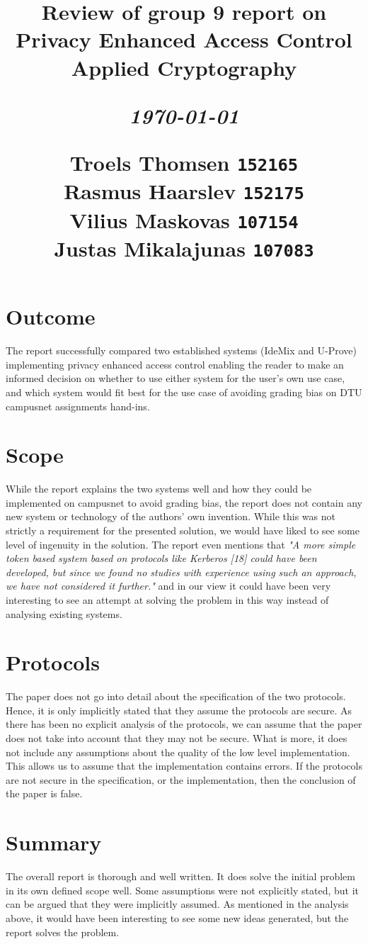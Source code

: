 \documentclass[12pt]{article}
\title{
  \vspace{4cm}
  \begin{flushleft}
  \Large{\textbf{Review of group 9 report on Privacy Enhanced Access Control}} \\
  \large{Applied Cryptography}
  \end{flushleft}
  \vspace{0cm}
  \begin{flushleft}
  \small
  \textit{\today}
  \end{flushleft}
  \vspace{12cm}
  \begin{flushleft}
  \small
  Troels Thomsen \texttt{152165} \\
  Rasmus Haarslev \texttt{152175} \\
  Vilius Maskovas \texttt{107154} \\
  Justas Mikalajunas \texttt{107083}\\
  \end{flushleft}
}
\date{
}
\begin{document}
\clearpage
{}
\thispagestyle{empty}
\maketitle


\section{Outcome}
\label{sec:Outcome}
The report successfully compared two established systems (IdeMix and U-Prove) implementing privacy enhanced access control enabling the reader to make an informed decision on whether to use either system for the user’s own use case, and which system would fit best for the use case of avoiding grading bias on DTU campusnet assignments hand-ins.

\section{Scope}
\label{sec:Scope}
While the report explains the two systems well and how they could be implemented on campusnet to avoid grading bias, the report does not contain any new system or technology of the authors’ own invention. While this was not strictly a requirement for the presented solution, we would have liked to see some level of ingenuity in the solution. The report even mentions that \textit{"A more simple token based system based on protocols like Kerberos [18] could have been developed, but since we found no studies with experience using such an approach, we have not considered it further."} and in our view it could have been very interesting to see an attempt at solving the problem in this way instead of analysing existing systems.

\section{Protocols}
\label{sec:Protocols}
The paper does not go into detail about the specification of the two protocols. Hence, it is only implicitly stated that they assume the protocols are secure. As there has been no explicit analysis of the protocols, we can assume that the paper does not take into account that they may not be secure. What is more, it does not include any assumptions about the quality of the low level implementation. This allows us to assume that the implementation contains errors. If the protocols are not secure in the specification, or the implementation, then the conclusion of the paper is false.


\section{Summary}
\label{sec:Summary}
The overall report is thorough and well written. It does solve the initial problem in its own defined scope well. Some assumptions were not explicitly stated, but it can be argued that they were implicitly assumed. As mentioned in the analysis above, it would have been interesting to see some new ideas generated, but the report solves the problem.
\end{document}
